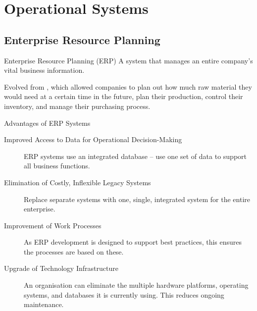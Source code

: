 \documentclass[\main/notes.tex]{subfiles}
\begin{document}
	\setcounter{chapter}{6}
	\chapter{Operational Systems}
		\section{Enterprise Resource Planning}
			\begin{definition}{Enterprise Resource Planning (ERP)}
				A system that manages an entire company's vital business information.

				Evolved from , which allowed companies to plan out how much raw material they would need at a certain time in the future, plan their production, control their inventory, and manage their purchasing process.
			\end{definition}
			\begin{sidenote}{Advantages of ERP Systems}
				\begin{description}
					\item[Improved Access to Data for Operational Decision-Making] ERP systems use an integrated database -- use one set of data to support all business functions.
					\item[Elimination of Costly, Inflexible Legacy Systems] Replace separate systems with one, single, integrated system for the entire enterprise.
					\item[Improvement of Work Processes] As ERP development is designed to support best practices, this ensures the processes are based on these.
					\item[Upgrade of Technology Infrastructure] An organisation can eliminate the multiple hardware platforms, operating systems, and databases it is currently using. This reduces ongoing maintenance.
				\end{description}
			\end{sidenote}
			\pagebreak
\end{document}
